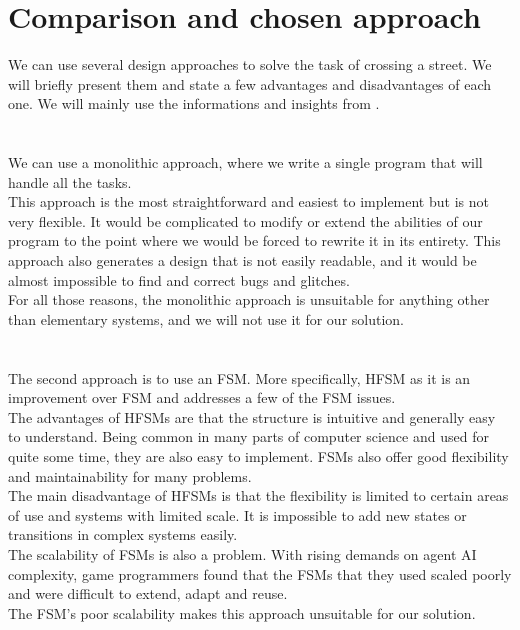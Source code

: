 \section{Comparison and chosen approach}
    We can use several design approaches to solve the task of crossing a street. We will briefly present them and state a few advantages and disadvantages of each one. We will mainly use the informations and insights from \cite{BT_intro}.\\\\
    \\
        We can use a monolithic approach, where we write a single program that will handle all the tasks.\\
        This approach is the most straightforward and easiest to implement but is not very flexible. It would be complicated to modify or extend the abilities of our program to the point where we would be forced to rewrite it in its entirety. This approach also generates a design that is not easily readable, and it would be almost impossible to find and correct bugs and glitches.\\
        For all those reasons, the monolithic approach is unsuitable for anything other than elementary systems, and we will not use it for our solution.\\\\
    \\
        The second approach is to use an FSM. More specifically, HFSM as it is an improvement over FSM and addresses a few of the FSM issues.\\
        The advantages of HFSMs are that the structure is intuitive and generally easy to understand. Being common in many parts of computer science and used for quite some time, they are also easy to implement. FSMs also offer good flexibility and maintainability for many problems.\\
        The main disadvantage of HFSMs is that the flexibility is limited to certain areas of use and systems with limited scale. It is impossible to add new states or transitions in complex systems easily.\\
        The scalability of FSMs is also a problem. With rising demands on agent AI complexity, game programmers found that the FSMs that they used scaled poorly and were difficult to extend, adapt and reuse.\cite{BT_survey}\\
        The FSM's poor scalability makes this approach unsuitable for our solution.\\\\
